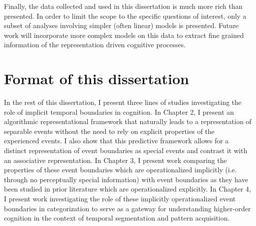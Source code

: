 Finally, the data collected and used in this dissertation is much more rich than presented. In order to limit the scope to the specific questions of interest, only a subset of analyses involving simpler (often linear) models is presented. Future work will incorporate more complex models on this data to extract fine grained information of the representation driven cognitive processes.


\section{Format of this dissertation}\label{format-of-this-dissertation}

In the rest of this dissertation, I present three lines of studies investigating the role of implicit temporal boundaries in cognition. In Chapter 2, I present an algorithmic representational framework that naturally leads to a representation of separable events without the need to rely on explicit properties of the experienced events. I also show that this predictive framework allows for a distinct representation of event boundaries as special events and contrast it with an associative representation. In Chapter 3, I present work comparing the properties of these event boundaries which are operationalized implicitly (i.e. through no perceptually special information) with event boundaries as they have been studied in prior literature which are operationalized explicitly. In Chapter 4, I present work investigating the role of these implicitly operationalized event boundaries in categorization to serve as a gateway for understanding higher-order cognition in the context of temporal segmentation and pattern acquisition. 
